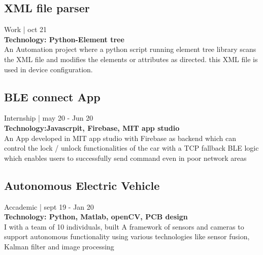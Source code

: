\documentclass[]{Abhijoshi}
\begin{document}
\begin{minipage}[t]{0.49\textwidth}
\vspace{2mm}



\subsection{XML \MakeLowercase{file Parser}}
Work | oct 21 \\
\vspace{0.5mm}
\textbf{Technology: Python-Element tree} \\
\vspace{0.5mm}
An Automation project where a python script running element tree library scans the XML file and modifies the elements or attributes as directed. this XML file is used in device configuration.
\vspace{2mm}

\subsection{BLE \MakeLowercase{connect} A\MakeLowercase{pp}}
Internship | may 20 - Jun 20 \\
\vspace{0.5mm}
\textbf{Technology:Javascrpit, Firebase, MIT app studio} \\
\vspace{0.5mm}
An App developed in MIT app studio with Firebase as backend which can control the lock / unlock functionalities of the car with a TCP fallback BLE logic which enables users to successfully send command even in poor network areas

\vspace{2mm}

\subsection{A\MakeLowercase{utonomous} E\MakeLowercase{lectric} V\MakeLowercase{ehicle}}
Accademic | sept 19 - Jan 20 \\
\vspace{0.5mm}
\textbf{Technology: Python, Matlab, openCV, PCB design}
\vspace{0.5mm}\\
I with a team of 10 individuals, built A framework
of sensors and cameras to support autonomous
functionality using various technologies like sensor
fusion, Kalman filter and image processing

\vspace{2mm}


\end{minipage}
\end{document}
